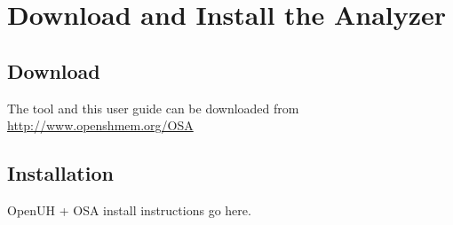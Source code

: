 \section{Download and Install the \openshmem Analyzer}

\subsection{Download}

The tool and this user guide can be downloaded from
\url{http://www.openshmem.org/OSA}

\subsection{Installation}

OpenUH + OSA install instructions go here.
